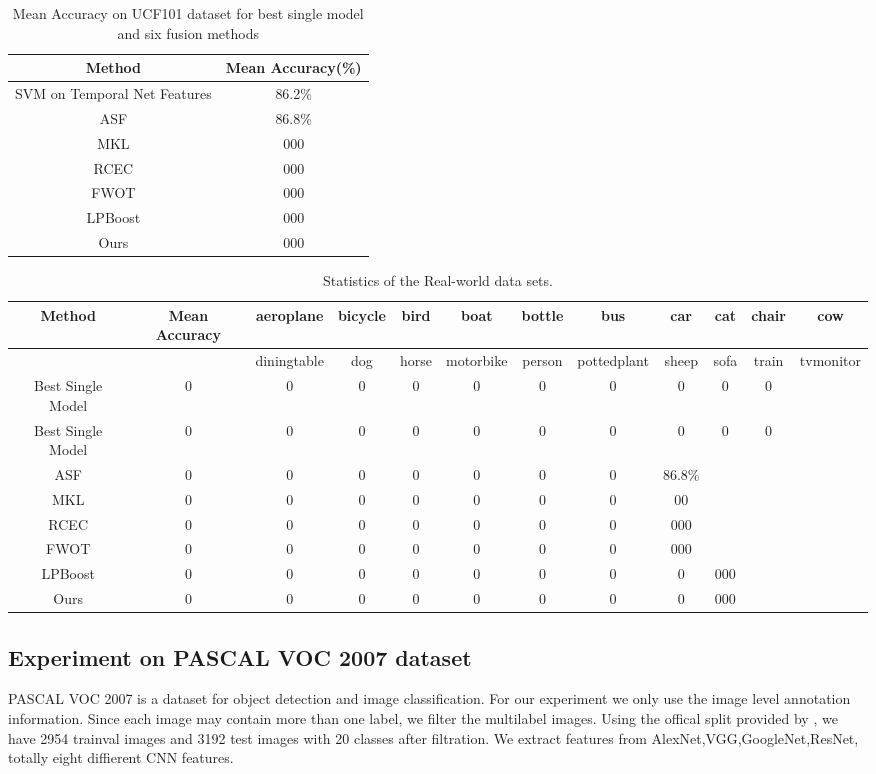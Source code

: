 \documentclass[letterpaper]{article}
\begin{document}
\begin{table}[h]\small
\centering
\label{table:ucf101}
\begin{tabular}{c|c}
\hline
Method & Mean Accuracy(\%) \\\hline
SVM on Temporal Net Features & 86.2\% \\\hline
ASF &  86.8\% \\
MKL &  000 \\
RCEC &  000 \\
FWOT &  000 \\
LPBoost &  000 \\\hline
Ours &  000 \\
\hline
\end{tabular}
\caption{Mean Accuracy on UCF101 dataset for best single model and six fusion methods}
\end{table}


\begin{table}[t]\scriptsize
\centering
\label{table:voc}
\begin{tabular}{c|c|c|c|c|c|c|c|c|c|c|c}
\hline
Method & Mean Accuracy & aeroplane & bicycle & bird & boat & bottle & bus & car & cat & chair & cow \\\hline
       &   & diningtable & dog & horse & motorbike & person & pottedplant & sheep & sofa & train & tvmonitor \\\hline
Best Single Model & 0 & 0 & 0 & 0 & 0 & 0 & 0 & 0 & 0 & 0\\
Best Single Model & 0 & 0 & 0 & 0 & 0 & 0 & 0 & 0 & 0 & 0\\\hline
ASF     & 0 & 0 & 0 & 0 & 0 & 0 & 0 & 86.8\% \\
MKL     & 0 & 0 & 0 & 0 & 0 & 0 & 0 & 00 \\
RCEC    & 0 & 0 & 0 & 0 & 0 & 0 & 0 & 000 \\
FWOT    & 0 & 0 & 0 & 0 & 0 & 0 & 0 & 000 \\
LPBoost & 0 & 0 & 0 & 0 & 0 & 0 & 0 & 0 & 000 \\\hline
Ours    & 0 & 0 & 0 & 0 & 0 & 0 & 0 & 0 & 000 \\
\hline
\end{tabular}
\caption{Statistics of the Real-world data sets.}
\end{table}

\subsection{Experiment on PASCAL VOC 2007 dataset}
PASCAL VOC 2007 is a dataset for object detection and image classification. For our experiment we only use the image level annotation information. Since each image may contain more than one label, we filter the multilabel images. Using the offical split provided by \cite{pascal-voc-2007}, we have 2954 trainval images and 3192 test images with 20 classes after filtration. We extract features from AlexNet,VGG,GoogleNet,ResNet, totally eight diffierent CNN features.
\end{document}
